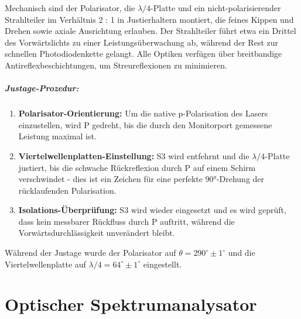 Mechanisch sind der Polarisator, die $\lambda/4$-Platte und ein nicht-polarisierender Strahlteiler im Verhältnis 2 : 1 in Justierhaltern montiert, die feines Kippen und Drehen sowie axiale Ausrichtung erlauben. 
Der Strahlteiler führt etwa ein Drittel des Vorwärtslichts zu einer Leistungsüberwachung ab, während der Rest zur schnellen Photodiodenkette gelangt. Alle Optiken verfügen über breitbandige Antireflexbeschichtungen, um Streureflexionen zu minimieren.

\paragraph{Justage-Prozedur:}
\begin{enumerate}
  \item \textbf{Polarisator-Orientierung:} Um die native p-Polarisation des Lasers einzustellen, wird P gedreht, bis die durch den Monitorport gemessene Leistung maximal ist.
  \item \textbf{Viertelwellenplatten-Einstellung:} S3 wird entfehrnt und  die $\lambda/4$-Platte justiert, bis die schwache Rückreflexion durch P auf einem Schirm verschwindet - dies ist ein Zeichen für eine perfekte 90°-Drehung der rücklaufenden Polarisation.
  \item \textbf{Isolations-Überprüfung:} S3 wird wieder eingesetzt und es wird geprüft, dass kein messbarer Rückfluss durch P auftritt, während die Vorwärtsdurchlässigkeit unverändert bleibt.  
\end{enumerate}
Während der Justage wurde der Polarisator auf $\theta = 290^\circ \pm 1^\circ$ und die Viertelwellenplatte auf $\lambda/4 = 64^\circ \pm 1^\circ$ eingestellt.


\chapter{Optischer Spektrumanalysator} \label{sec:5.7}

